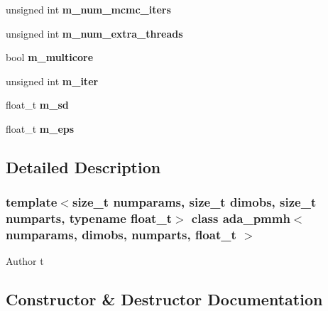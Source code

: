 \begin{DoxyCompactItemize}
unsigned int {\bfseries m\+\_\+num\+\_\+mcmc\+\_\+iters}
\item 
\mbox{\label{classada__pmmh_ab4a5a60bd0ef703ee0b7b04610a5ff56}} 
unsigned int {\bfseries m\+\_\+num\+\_\+extra\+\_\+threads}
\item 
\mbox{\label{classada__pmmh_afe76d23b5c190fb82fbe4845652eb6f6}} 
bool {\bfseries m\+\_\+multicore}
\item 
\mbox{\label{classada__pmmh_a7915a4100c2f57cf097a2bad372323b3}} 
unsigned int {\bfseries m\+\_\+iter}
\item 
\mbox{\label{classada__pmmh_adcec6c306df8e90ae7bb9053af864922}} 
float\+\_\+t {\bfseries m\+\_\+sd}
\item 
\mbox{\label{classada__pmmh_ad03476d51014ce496a88823d2f10f699}} 
float\+\_\+t {\bfseries m\+\_\+eps}
\end{DoxyCompactItemize}


\subsection{Detailed Description}
\subsubsection*{template$<$size\+\_\+t numparams, size\+\_\+t dimobs, size\+\_\+t numparts, typename float\+\_\+t$>$\newline
class ada\+\_\+pmmh$<$ numparams, dimobs, numparts, float\+\_\+t $>$}

\begin{DoxyAuthor}{Author}
t 
\end{DoxyAuthor}


\subsection{Constructor \& Destructor Documentation}
\mbox{\label{classada__pmmh_a5ada0a36d005ab71ef337a8819268d31}} 
